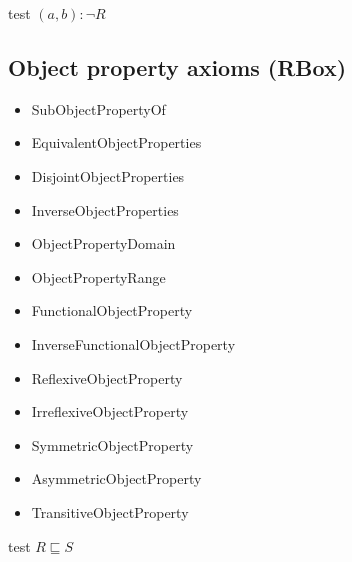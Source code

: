 \documentclass[paper.tex]{subfiles}
\begin{document}
\begin{algorithm}[H]
  \caption{test $(a, b) : \neg R$}
  \begin{algorithmic}[1]
    \raggedright
      \State \todo
    \EndFunction
  \end{algorithmic}
\end{algorithm}

\subsection{Object property axioms (RBox)}

\begin{itemize}[noitemsep]
  \ttfamily
  \item SubObjectPropertyOf
  \item EquivalentObjectProperties
  \item DisjointObjectProperties
  \item InverseObjectProperties
  \item ObjectPropertyDomain
  \item ObjectPropertyRange
  \item FunctionalObjectProperty
  \item InverseFunctionalObjectProperty
  \item ReflexiveObjectProperty
  \item IrreflexiveObjectProperty
  \item SymmetricObjectProperty
  \item AsymmetricObjectProperty
  \item TransitiveObjectProperty
\end{itemize}

\begin{algorithm}[H]
  \caption{test $R \sqsubseteq S$}
  \begin{algorithmic}[1]
      \State \todo
    \EndFunction
  \end{algorithmic}
\end{algorithm}

\end{document}
